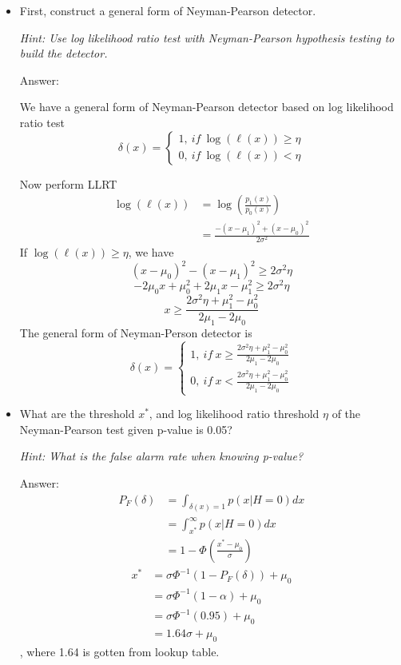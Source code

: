 \documentclass{article}
\newenvironment{answer}{\par\begingroup\color{answer}Answer: }{\endgroup}
\newcommand{\hint}[1]{\textcolor{black!60!white}{\emph{Hint: #1}}}
\begin{document}
\begin{itemize}
\item First, construct a general form of Neyman-Pearson detector. 

\hint{%
Use log likelihood ratio test with Neyman-Pearson hypothesis testing to build the detector.
}

\begin{answer}

We have a general form of Neyman-Pearson detector based on log likelihood ratio test
\[  \delta(x) = 
\begin{cases}
  1,~if~\log(\ell(x)) \geq \eta\\
  0,~if~\log(\ell(x)) < \eta
\end{cases}\]

Now perform LLRT
\begin{align*}
\log(\ell(x)) &= \log(\frac{p_1(x)}{p_0(x)}) \\ 
            &= \frac{-(x-\mu_1)^2 + (x-\mu_0)^2}{2\sigma^2} 
\end{align*}
If $\log(\ell(x)) \geq \eta$, we have
\[
(x-\mu_0)^2 -(x-\mu_1)^2 \geq 2 \sigma^2 \eta
\]
\[
- 2\mu_0 x + \mu_0^2 + 2\mu_1 x - \mu_1^2  \geq 2 \sigma^2 \eta
\]
\[
 x \geq \frac{2 \sigma^2 \eta +\mu_1^2 -\mu_0^2 }{2\mu_1 - 2\mu_0}
\]
The general form of Neyman-Person detector is
\[
  \delta(x) = 
\begin{cases}
  1,~if~x \geq \frac{2 \sigma^2 \eta +\mu_1^2 -\mu_0^2 }{2\mu_1 - 2\mu_0}\\
  0,~if~x < \frac{2 \sigma^2 \eta +\mu_1^2 -\mu_0^2 }{2\mu_1 - 2\mu_0}
\end{cases}
\]
\end{answer}

\item What are the threshold $x^*$, and log likelihood ratio threshold $\eta$ of the Neyman-Pearson test given p-value is 0.05?

\hint{%
What is the false alarm rate when knowing p-value?
}
\begin{answer} 
\begin{align*}
P_F(\delta) &= \int_{\delta(x) = 1}p(x|H=0)dx \\
            &= \int_{x^*}^{\infty}p(x|H=0)dx \\ 
            &= 1 - \Phi(\frac{x^* - \mu_0}{\sigma})
\end{align*}
\begin{align*}
x^* &= \sigma\Phi^{-1}(1-P_F(\delta)) + \mu_0 \\
            &= \sigma\Phi^{-1}(1-\alpha) + \mu_0 \\ 
            &= \sigma\Phi^{-1}(0.95) + \mu_0 \\
            & = 1.64\sigma + \mu_0
\end{align*}
, where 1.64 is gotten from lookup table.


\end{answer}
\end{itemize}
\end{document}
